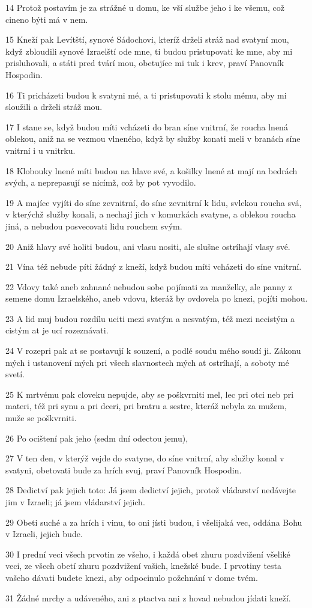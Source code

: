 \par 14 Protož postavím je za strážné u domu, ke vší službe jeho i ke všemu, což cineno býti má v nem.
\par 15 Kneží pak Levítští, synové Sádochovi, kteríž drželi stráž nad svatyní mou, když zbloudili synové Izraelští ode mne, ti budou pristupovati ke mne, aby mi prisluhovali, a státi pred tvárí mou, obetujíce mi tuk i krev, praví Panovník Hospodin.
\par 16 Ti pricházeti budou k svatyni mé, a ti pristupovati k stolu mému, aby mi sloužili a drželi stráž mou.
\par 17 I stane se, když budou míti vcházeti do bran síne vnitrní, že roucha lnená oblekou, aniž na se vezmou vlneného, když by služby konati meli v branách síne vnitrní i u vnitrku.
\par 18 Klobouky lnené míti budou na hlave své, a košilky lnené at mají na bedrách svých, a neprepasují se nicímž, což by pot vyvodilo.
\par 19 A majíce vyjíti do síne zevnitrní, do síne zevnitrní k lidu, svlekou roucha svá, v kterýchž služby konali, a nechají jich v komurkách svatyne, a oblekou roucha jiná, a nebudou posvecovati lidu rouchem svým.
\par 20 Aniž hlavy své holiti budou, ani vlasu nositi, ale slušne ostríhají vlasy své.
\par 21 Vína též nebude píti žádný z kneží, když budou míti vcházeti do síne vnitrní.
\par 22 Vdovy také aneb zahnané nebudou sobe pojímati za manželky, ale panny z semene domu Izraelského, aneb vdovu, kteráž by ovdovela po knezi, pojíti mohou.
\par 23 A lid muj budou rozdílu uciti mezi svatým a nesvatým, též mezi necistým a cistým at je ucí rozeznávati.
\par 24 V rozepri pak at se postavují k souzení, a podlé soudu mého soudí ji. Zákonu mých i ustanovení mých pri všech slavnostech mých at ostríhají, a soboty mé svetí.
\par 25 K mrtvému pak cloveku nepujde, aby se poškvrniti mel, lec pri otci neb pri materi, též pri synu a pri dceri, pri bratru a sestre, kteráž nebyla za mužem, muže se poškvrniti.
\par 26 Po ocištení pak jeho (sedm dní odectou jemu),
\par 27 V ten den, v kterýž vejde do svatyne, do síne vnitrní, aby služby konal v svatyni, obetovati bude za hrích svuj, praví Panovník Hospodin.
\par 28 Dedictví pak jejich toto: Já jsem dedictví jejich, protož vládarství nedávejte jim v Izraeli; já jsem vládarství jejich.
\par 29 Obeti suché a za hrích i vinu, to oni jísti budou, i všelijaká vec, oddána Bohu v Izraeli, jejich bude.
\par 30 I prední veci všech prvotin ze všeho, i každá obet zhuru pozdvižení všeliké veci, ze všech obetí zhuru pozdvižení vašich, knežské bude. I prvotiny testa vašeho dávati budete knezi, aby odpocinulo požehnání v dome tvém.
\par 31 Žádné mrchy a udáveného, ani z ptactva ani z hovad nebudou jídati kneží.


